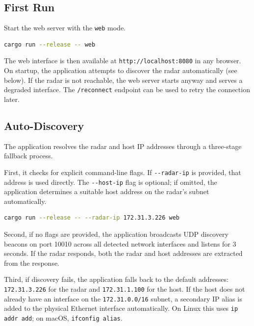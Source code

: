 \documentclass[11pt,letterpaper]{article}
\begin{document}
\subsection{First Run}
\label{subsec:first-run}

Start the web server with the \texttt{web} mode.

\begin{lstlisting}[language=bash]
cargo run --release -- web
\end{lstlisting}

The web interface is then available at \texttt{http://localhost:8080} in any browser. On startup, the application attempts to discover the radar automatically (see below). If the radar is not reachable, the web server starts anyway and serves a degraded interface. The \texttt{/reconnect} endpoint can be used to retry the connection later.

\subsection{Auto-Discovery}
\label{subsec:auto-discovery-quickstart}

The application resolves the radar and host IP addresses through a three-stage fallback process.

First, it checks for explicit command-line flags. If \texttt{-{}-radar-ip} is provided, that address is used directly. The \texttt{-{}-host-ip} flag is optional; if omitted, the application determines a suitable host address on the radar's subnet automatically.

\begin{lstlisting}[language=bash]
cargo run --release -- --radar-ip 172.31.3.226 web
\end{lstlisting}

Second, if no flags are provided, the application broadcasts UDP discovery beacons on port 10010 across all detected network interfaces and listens for 3 seconds. If the radar responds, both the radar and host addresses are extracted from the response.

Third, if discovery fails, the application falls back to the default addresses: \texttt{172.31.3.226} for the radar and \texttt{172.31.1.100} for the host. If the host does not already have an interface on the \texttt{172.31.0.0/16} subnet, a secondary IP alias is added to the physical Ethernet interface automatically. On Linux this uses \texttt{ip addr add}; on macOS, \texttt{ifconfig alias}.


\newpage
\end{document}
